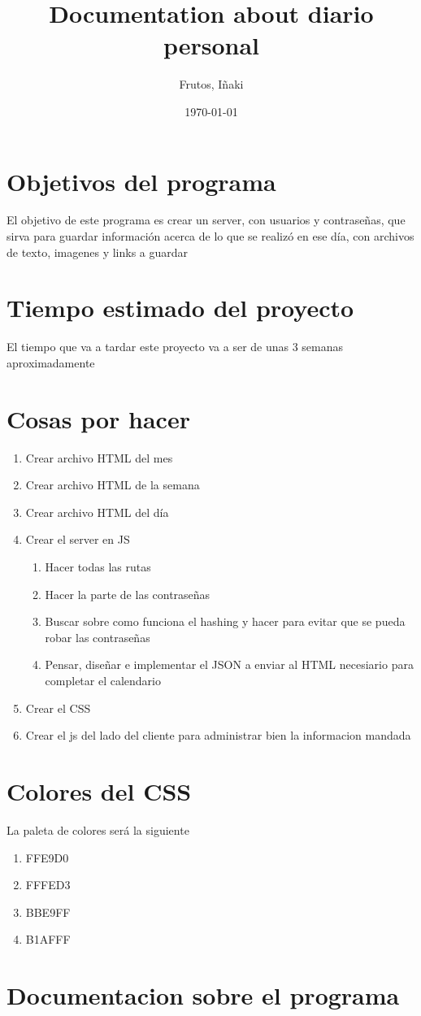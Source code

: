 \documentclass[12pt]{article}
\title{Documentation about diario personal}
\author{Frutos, I\~{n}aki}
\date{\today}
\begin{document}
\maketitle
\tableofcontents

\section{Objetivos del programa}
\begin{normalsize}
 El objetivo de este programa es crear un server, con usuarios 	y contraseñas, que sirva para guardar información acerca de lo que se realizó en ese día, con archivos de texto, imagenes y 	links a guardar
 \end{normalsize}
\section{Tiempo estimado del proyecto}
	El tiempo que va a tardar este proyecto va a ser de unas 3 			semanas aproximadamente
\section{Cosas por hacer}
	\begin{enumerate}
		\item Crear archivo HTML del mes
		\item Crear archivo HTML de la semana
		\item Crear archivo HTML del día
		\item Crear el server en JS
		\begin{enumerate}
			\item Hacer todas las rutas
			\item Hacer la parte de las contraseñas
			\item Buscar sobre como funciona el hashing y hacer para evitar que se pueda robar las contraseñas
			\item Pensar, diseñar e implementar el JSON a enviar al HTML necesiario para completar el calendario
		\end{enumerate}
		\item Crear el CSS
		\item Crear el js del lado del cliente para administrar bien la informacion mandada
	\end{enumerate}
\section{Colores del CSS}
La paleta de colores será la siguiente
\begin{enumerate}
    \item FFE9D0
    \item FFFED3
    \item BBE9FF
    \item B1AFFF
\end{enumerate}
\section{Documentacion sobre el programa}
	
	
\end{document}
